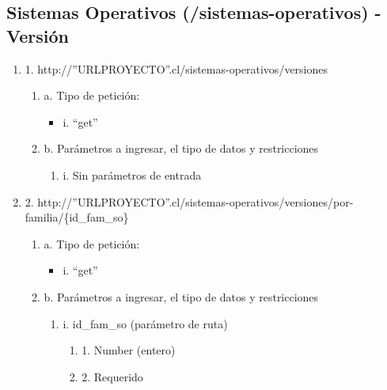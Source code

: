 \subsection{Sistemas Operativos (/sistemas-operativos) - Versión}

\begin{enumerate}
    \item 1. http://”URLPROYECTO”.cl/sistemas-operativos/versiones
    \begin{enumerate}
        \item a. Tipo de petición:
            \begin{itemize}
               \item i. “get”
            \end{itemize}
        \item b. Parámetros a ingresar, el tipo de datos y restricciones
            \begin{enumerate}
                \item i. Sin parámetros de entrada
            \end{enumerate}
    \end{enumerate}

    \item 2. http://”URLPROYECTO”.cl/sistemas-operativos/versiones/por-familia/\{id\_fam\_so\}
    \begin{enumerate}
        \item a. Tipo de petición:
            \begin{itemize}
               \item i. “get”
            \end{itemize}
        \item b. Parámetros a ingresar, el tipo de datos y restricciones
            \begin{enumerate}
                \item i. id\_fam\_so (parámetro de ruta)
                    \begin{enumerate}
                        \item 1. Number (entero)
                        \item 2. Requerido
                    \end{enumerate}
            \end{enumerate}
    \end{enumerate}


\end{enumerate}
